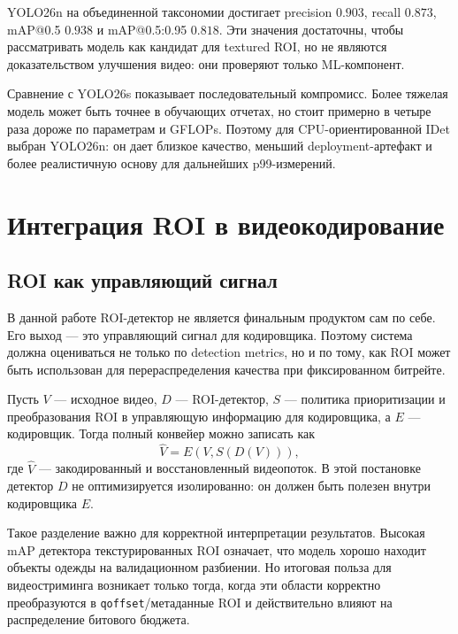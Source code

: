 \documentclass[12pt,a4paper,oneside,openany]{report}
\begin{document}
YOLO26n на объединенной таксономии достигает precision $0.903$, recall $0.873$,
mAP@0.5 $0.938$ и mAP@0.5:0.95 $0.818$. Эти значения достаточны, чтобы рассматривать модель как
кандидат для textured ROI, но не являются доказательством улучшения видео: они проверяют только
ML-компонент.

Сравнение с YOLO26s показывает последовательный компромисс. Более тяжелая модель может быть
точнее в обучающих отчетах, но стоит примерно в четыре раза дороже по параметрам и GFLOPs.
Поэтому для CPU-ориентированной IDet выбран YOLO26n: он дает близкое качество, меньший
deployment-артефакт и более реалистичную основу для дальнейших p99-измерений.


\chapter{Интеграция ROI в видеокодирование}


\section{ROI как управляющий сигнал}

В данной работе ROI-детектор не является финальным продуктом сам по себе. Его выход --- это
управляющий сигнал для кодировщика. Поэтому система должна оцениваться не только по detection
metrics, но и по тому, как ROI может быть использован для перераспределения качества при
фиксированном битрейте.

Пусть $V$ --- исходное видео, $D$ --- ROI-детектор, $S$ --- политика приоритизации и
преобразования ROI в управляющую информацию для кодировщика, а $E$ --- кодировщик. Тогда полный
конвейер можно записать как
\begin{equation}
  \hat{V} = E(V, S(D(V))),
  \label{eq:pipeline}
\end{equation}
где $\hat{V}$ --- закодированный и восстановленный видеопоток. В этой постановке детектор $D$ не
оптимизируется изолированно: он должен быть полезен внутри кодировщика $E$.

Такое разделение важно для корректной интерпретации результатов. Высокая mAP детектора
текстурированных ROI означает, что модель хорошо находит объекты одежды на валидационном
разбиении. Но итоговая польза для видеостриминга возникает только тогда, когда эти области
корректно преобразуются в \texttt{qoffset}/метаданные ROI и действительно влияют на
распределение битового бюджета.
\end{document}
